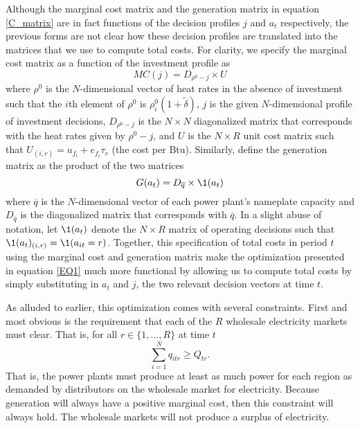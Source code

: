 Although the marginal cost matrix and the generation matrix in equation \eqref{C_matrix} are in fact functions of the decision profiles $j$ and $a_t$ respectively, the previous forms are not clear how these decision profiles are translated into the matrices that we use to compute total costs. For clarity, we specify the marginal cost matrix as a function of the investment profile as
\begin{equation}
    MC(j) = D_{\rho^0 - j} \times U
\end{equation}
where $\rho^0$ is the $N$-dimensional vector of heat rates in the absence of investment such that the $i$th element of $\rho^0$ is $\rho_i^0(1 + \tilde{\delta})$, $j$ is the given $N$-dimensional profile of investment decisions, $D_{\rho^0 - j}$ is the $N\times N$ diagonalized matrix that corresponds with the heat rates given by $\rho^0 - j$, and $U$ is the $N\times R$ unit cost matrix such that $U_{(i,r)} = u_{f_i} + e_{f_i}\tau_r$ (the cost per Btu). Similarly, define the generation matrix as the product of the two matrices
\begin{equation}
    G(a_t) = D_{\overline{q}} \times \1(a_t)
\end{equation}
where $\overline{q}$ is the $N$-dimensional vector of each power plant's nameplate capacity and $D_{\overline{q}}$ is the diagonalized matrix that corresponds with $\overline{q}$. In a slight abuse of notation, let $\1(a_t)$ denote the $N\times R$ matrix of operating decisions such that $\1(a_t)_{(i,r)} = \1(a_{it} = r)$. Together, this specification of total costs in period $t$ using the marginal cost and generation matrix make the optimization presented in equation \eqref{EQ1} much more functional by allowing us to compute total costs by simply substituting in $a_t$ and $j$, the two relevant decision vectors at time $t$. 

As alluded to earlier, this optimization comes with several constraints. First and most obvious is the requirement that each of the $R$ wholesale electricity markets must clear. That is, for all $r \in \{1, \ldots, R\}$ at time $t$
\begin{equation}
    \sum_{i =1}^N q_{itr} \geq Q_{tr}. 
\end{equation}
That is, the power plants must produce at least as much power for each region as demanded by distributors on the wholesale market for electricity. Because generation will always have a positive marginal cost, then this constraint will always hold. The wholesale markets will not produce a surplus of electricity.


